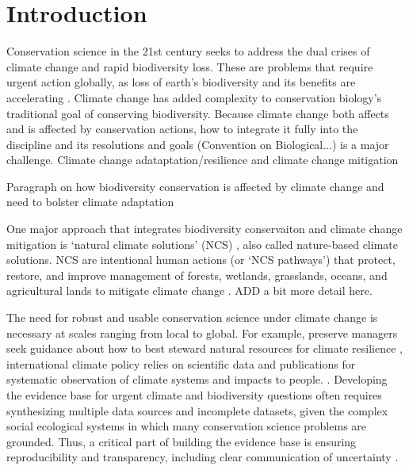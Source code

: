 \documentclass{article}
\begin{document}
\newpage
\section* {Introduction}

\par Conservation science in the 21st century seeks to address the dual crises of  climate change and rapid biodiversity loss. These are problems that require urgent action globally, as loss of earth's biodiversity and its benefits are accelerating \citep{brondizio2019assessing, ripple2017extinction,tittensor2014mid}. Climate change has added complexity to conservation biology's traditional goal of conserving biodiversity. Because climate change both affects and is affected by conservation actions, how to integrate it fully into the discipline and its resolutions and goals (Convention on Biological...) is a major challenge. Climate change adataptation/resilience and climate change mitigation
\par Paragraph on how biodiversity conservation is affected by climate change and need to bolster climate adaptation
\par One major approach that integrates biodiversity conservaiton and climate change mitigation is `natural climate solutions' (NCS) \citep{ellis2024principles}, also called nature-based climate solutions. NCS are intentional human actions (or `NCS pathways') that protect, restore, and improve management of forests, wetlands, grasslands, oceans, and agricultural lands to mitigate climate change \citep{griscom2017natural}. ADD a bit more detail here.

\par The need for robust and usable conservation science under climate change is necessary at scales ranging from local to global. For example, preserve managers seek guidance about how to best steward natural resources for climate resilience \citep{Nadeau2015}, international climate policy relies on scientific data and publications for systematic observation of climate systems and impacts to people. \cite{ipcc2007}. Developing the evidence base for urgent climate and biodiversity questions often requires synthesizing multiple data sources and incomplete datasets, given the complex social ecological systems in which many conservation science problems are grounded. Thus, a critical part of building the evidence base is ensuring reproducibility and transparency, including clear communication of uncertainty \citep{ellis2024principles,ipcc2007}. %
\end{document}

